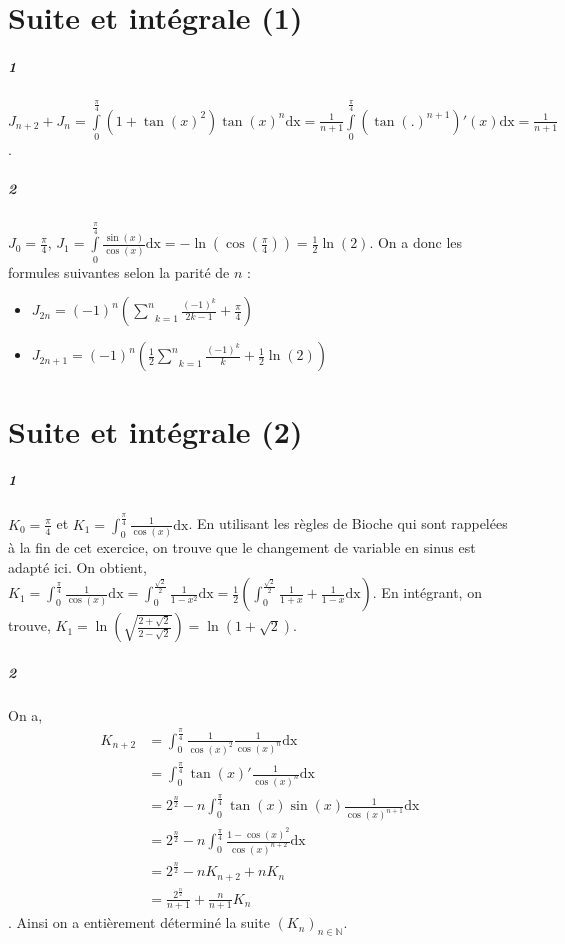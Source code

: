 \documentclass[10pt,a4paper]{article}
\begin{document}
\section{Suite et intégrale (1)}
\subparagraph{1} $J_{n+2} + J_n = \underset{0}{\overset{\frac{\pi}{4}}{\int}}(1+ \tan(x)^2) \tan(x)^n \text{dx} = \frac{1}{n+1} \underset{0}{\overset{\frac{\pi}{4}}{\int}} (\tan(.)^{n+1})'(x) \text{dx} = \frac{1}{n+1}$.
\subparagraph{2} $J_0 = \frac{\pi}{4}$, $J_1 = \underset{0}{\overset{\frac{\pi}{4}}{\int}} \frac{\sin(x)}{\cos(x)} \text{dx} = -\ln(\cos(\frac{\pi}{4})) = \frac{1}{2}\ln(2)$.
On a donc les formules suivantes selon la parité de $n$ :
\begin{itemize}
\item $J_{2n} = (-1)^n \left( \underset{k=1}{\overset{n}{\sum}}\frac{(-1)^k}{2k-1} + \frac{\pi}{4} \right)$
\item $J_{2n+1} = (-1)^n \left(\frac{1}{2}\underset{k=1}{\overset{n}{\sum}}\frac{(-1)^k}{k} + \frac{1}{2}\ln(2) \right)$
\end{itemize}

\section{Suite et intégrale (2)}
\subparagraph{1}$K_0 = \frac{\pi}{4}$ et $K_1= \int_0^{\frac{\pi}{4}} \frac{1}{\cos(x)} \text{dx}$. En utilisant les règles de Bioche qui sont rappelées à la fin de cet exercice, on trouve que le changement de variable en sinus est adapté ici. On obtient, $K_1= \int_0^{\frac{\pi}{4}} \frac{1}{\cos(x)} \text{dx} = \int_0^{\frac{\sqrt{2}}{2}} \frac{1}{1-x^2} \text{dx} = \frac{1}{2} \left( \int_0^{\frac{\sqrt{2}}{2}} \frac{1}{1+x} + \frac{1}{1-x} \text{dx} \right)$. En intégrant, on trouve, $K_1 = \ln \left( \sqrt{\frac{2+ \sqrt{2}}{2 - \sqrt{2}}}\right)= \ln(1 + \sqrt{2})$.

\subparagraph{2} On a,
\begin{equation}
\begin{aligned}
K_{n+2} &= \int_0^{\frac{\pi}{4}} \frac{1}{\cos(x)^2} \frac{1}{\cos(x)^n} \text{dx} \\
&= \int_0^{\frac{\pi}{4}} \tan(x)' \frac{1}{\cos(x)^n} \text{dx} \\
&= 2^{\frac{n}{2}} - n \int_0^{\frac{\pi}{4}} \tan(x) \sin(x) \frac{1}{\cos(x)^{n+1}} \text{dx} \\
&= 2^{\frac{n}{2}} - n \int_0^{\frac{\pi}{4}} \frac{1-\cos(x)^2}{\cos(x)^{n+2}} \text{dx} \\
&=2^{\frac{n}{2}} - n K_{n+2} +nK_n \\
&=\frac{2^{\frac{n}{2}}}{n+1} + \frac{n}{n+1} K_n
\end{aligned}
\end{equation}.
Ainsi on a entièrement déterminé la suite $(K_n)_{n \in \mathbb{N}}$.
\end{document}
